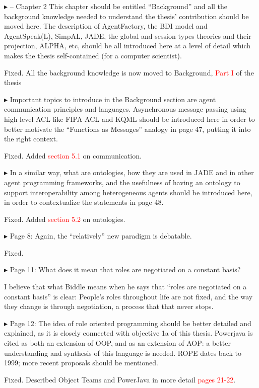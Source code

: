\documentclass{article}
\newcommand*\R[1]{\textcolor{red}{#1}} %
\newenvironment{them}%
  {\bigskip\noindent\begingroup\color{blue}$\blacktriangleright$\enspace}%
  {\endgroup\par}
\begin{document}
\begin{them}
-- Chapter 2
This chapter should be entitled ``Background'' and all the background knowledge
needed to understand the thesis' contribution should be moved here. The
description of AgentFactory, the BDI model and AgentSpeak(L), SimpAL, JADE, the
global and session types theories and their projection, ALPHA, etc, should be
all introduced here at a level of detail which makes the thesis self-contained
(for a computer scientist).
\end{them}
Fixed. All the background knowledge is now moved to Background, \R{Part I} of
the thesis

\begin{them}
Important topics to introduce in the Background section are agent communication
principles and languages. Asynchronous message passing using high level ACL
like FIPA ACL and KQML should be introduced here in order to better motivate
the ``Functions as Messages'' analogy in page 47, putting it into the right
context.
\end{them}
Fixed. Added \R{section 5.1} on communication.

\begin{them}
In a similar way, what are ontologies, how they are used in JADE and in other
agent programming frameworks, and the usefulness of having an ontology to
support interoperability among heterogeneous agents should be introduced here,
in order to contextualize the statements in page 48.
\end{them}
Fixed. Added \R{section 5.2} on ontologies.

\begin{them}
Page 8:
Again, the ``relatively'' new paradigm is debatable.
\end{them}
Fixed. 

\begin{them}
Page 11:
What does it mean that roles are negotiated on a constant basis?
\end{them}

I believe that what Biddle means when he says that ``roles are negotiated on
a constant basis'' is clear: People's roles throughout life are not fixed,
and the way they change is through negotiation, a process that that never
stops.


\begin{them}
Page 12:
The idea of role oriented programming should be better detailed and explained,
as it is closely connected with objective 1a of this thesis. Powerjava is cited
as both an extension of OOP, and as an extension of AOP: a better understanding
and synthesis of this language is needed. ROPE dates back to 1999; more recent
proposals should be mentioned.
\end{them}
Fixed. Described Object Teams and PowerJava in more detail \R{pages 21-22}.
\end{document}
